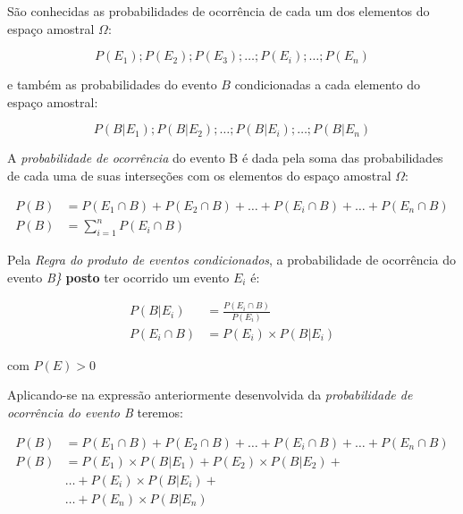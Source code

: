 \documentclass[
]{book}
\begin{document}
\hfill\break

São conhecidas as probabilidades de ocorrência de cada um dos elementos do espaço amostral \(\Omega\):

\hfill\break

\[
P(E_{1}); P(E_{2}); P(E_{3}); \dots;P(E_{i}); \dots; P(E_{n})
\]

\hfill\break

e também as probabilidades do evento \(B\) condicionadas a cada elemento do espaço amostral:

\hfill\break

\[
P(B|E_{1}); P(B|E_{2});\dots;P(B|E_{i});\dots; P(B|E_{n})
\]

\hfill\break

A \emph{probabilidade de ocorrência} do evento B é dada pela soma das probabilidades de cada uma de suas interseções com os elementos do espaço amostral \(\Omega\):

\hfill\break

\begin{align*}
P(B) & = P(E_{1} \cap B) + P(E_{2} \cap B) + \dots + P(E_{i} \cap B) + \dots  + P(E_{n} \cap B) \\
P(B) & = \sum _{i=1}^{n}P\left({E}_{i}\cap B\right)
\end{align*}

\hfill\break

Pela \emph{Regra do produto de eventos condicionados}, a probabilidade de ocorrência do evento \emph{B\}} \textbf{posto} ter ocorrido um evento \(E_{i}\) é:

\hfill\break

\begin{align*}
P(B|E_{i}) & = \frac{P(E_{i}\cap B)}{P(E_{i})} \\ 
P(E_{i}\cap B) & = P(E_{i}) \times P(B|E_{i}) 
\end{align*}

\hfill\break

com \(P(E) > 0\)

\hfill\break

Aplicando-se na expressão anteriormente desenvolvida da \emph{probabilidade de ocorrência do evento B} teremos:

\hfill\break
\begin{align*}
P(B) & = P(E_{1} \cap B) + P(E_{2} \cap B) + \dots + P(E_{i} \cap B) + \dots  + P(E_{n} \cap B) \\
P(B) & = P(E_{1}) \times P(B|E_{1}) + P(E_{2}) \times P(B|E_{2}) + \\
    & \dots +P(E_{i}) \times P(B|E_{i}) + \\
    & \dots  + P(E_{n}) \times P(B|E_{n}) 
\end{align*}
\end{document}
